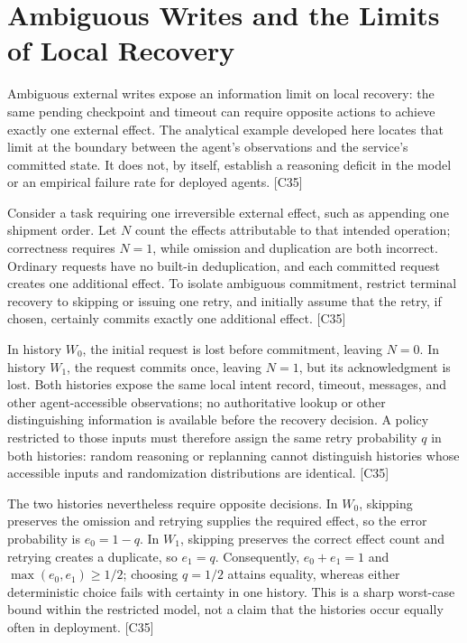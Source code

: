 \documentclass[11pt]{article}
\begin{document}
\section{Ambiguous Writes and the Limits of Local Recovery}
Ambiguous external writes expose an information limit on local recovery: the same pending checkpoint and timeout can require opposite actions to achieve exactly one external effect. The analytical example developed here locates that limit at the boundary between the agent\textquoteright{}s observations and the service\textquoteright{}s committed state. It does not, by itself, establish a reasoning deficit in the model or an empirical failure rate for deployed agents. [C35]

Consider a task requiring one irreversible external effect, such as appending one shipment order. Let $N$ count the effects attributable to that intended operation; correctness requires $N=1$, while omission and duplication are both incorrect. Ordinary requests have no built-in deduplication, and each committed request creates one additional effect. To isolate ambiguous commitment, restrict terminal recovery to skipping or issuing one retry, and initially assume that the retry, if chosen, certainly commits exactly one additional effect. [C35]

In history $W_0$, the initial request is lost before commitment, leaving $N=0$. In history $W_1$, the request commits once, leaving $N=1$, but its acknowledgment is lost. Both histories expose the same local intent record, timeout, messages, and other agent-accessible observations; no authoritative lookup or other distinguishing information is available before the recovery decision. A policy restricted to those inputs must therefore assign the same retry probability $q$ in both histories: random reasoning or replanning cannot distinguish histories whose accessible inputs and randomization distributions are identical. [C35]

The two histories nevertheless require opposite decisions. In $W_0$, skipping preserves the omission and retrying supplies the required effect, so the error probability is $e_0=1-q$. In $W_1$, skipping preserves the correct effect count and retrying creates a duplicate, so $e_1=q$. Consequently, $e_0+e_1=1$ and $\max(e_0,e_1)\geq 1/2$; choosing $q=1/2$ attains equality, whereas either deterministic choice fails with certainty in one history. This is a sharp worst-case bound within the restricted model, not a claim that the histories occur equally often in deployment. [C35]
\end{document}
